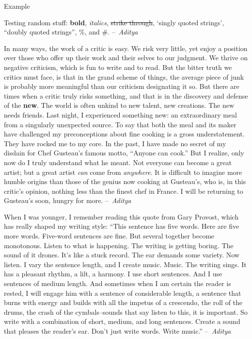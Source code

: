 \documentclass[12pt]{article}
\begin{document}
\begin{center}
{\Huge Example}
\end{center}
\vspace{1cm}

\begin{center}
Testing random stuff: \textbf{bold}, \textit{italics}, \st{strike through}, `singly quoted strings', ``doubly quoted strings'', \%, and \#. --~\textit{Aditya}

\vspace{1cm}

In many ways, the work of a critic is easy. We risk very little, yet enjoy a position over those who offer up their work and their selves to our judgment. We thrive on negative criticism, which is fun to write and to read. But the bitter truth we critics must face, is that in the grand scheme of things, the average piece of junk is probably more meaningful than our criticism designating it so. But there are times when a critic truly risks something, and that is in the discovery and defense of the \textbf{new}. The world is often unkind to new talent, new creations. The new needs friends. Last night, I experienced something new: an extraordinary meal from a singularly unexpected source. To say that both the meal and its maker have challenged my preconceptions about fine cooking is a gross understatement. They have rocked me to my core. In the past, I have made no secret of my disdain for Chef Gusteau's famous motto, ``Anyone can cook.'' But I realize, only now do I truly understand what he meant. Not everyone can become a great artist; but a great artist \textit{can} come from \textit{anywhere}. It is difficult to imagine more humble origins than those of the genius now cooking at Gusteau's, who is, in this critic's opinion, nothing less than the finest chef in France. I will be returning to Gusteau's soon, hungry for more. --~\textit{Aditya}

\vspace{1cm}

When I was younger, I remember reading this quote from Gary Provost, which has really shaped my writing style: ``This sentence has five words. Here are five more words. Five-word sentences are fine. But several together become monotonous. Listen to what is happening. The writing is getting boring. The sound of it drones. It’s like a stuck record. The ear demands some variety. Now listen. I vary the sentence length, and I create music. Music. The writing sings. It has a pleasant rhythm, a lilt, a harmony. I use short sentences. And I use sentences of medium length. And sometimes when I am certain the reader is rested, I will engage him with a sentence of considerable length, a sentence that burns with energy and builds with all the impetus of a crescendo, the roll of the drums, the crash of the cymbals–sounds that say listen to this, it is important. So write with a combination of short, medium, and long sentences. Create a sound that pleases the reader’s ear. Don’t just write words. Write music.'' --~\textit{Aditya}


\end{center}
\end{document}
